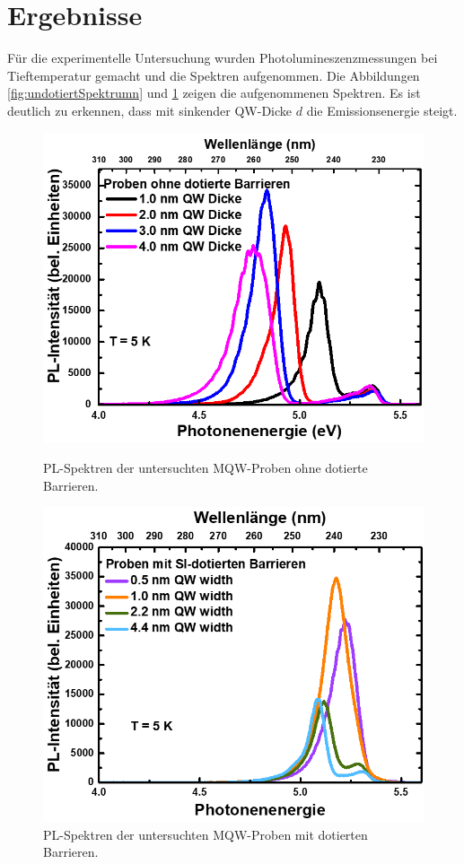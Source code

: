 \section{Ergebnisse}
Für die experimentelle Untersuchung wurden Photolumineszenzmessungen bei Tieftemperatur gemacht und die Spektren aufgenommen.
Die Abbildungen \ref{fig:undotiertSpektrumn} und \ref{fig:dotiertSpektrumn} zeigen die aufgenommenen Spektren.
Es ist deutlich zu erkennen, dass mit sinkender QW-Dicke $d$ die Emissionsenergie steigt.
\begin{figure}[H]
  \centering
  \begin{minipage}[t]{0.45\textwidth}
    \centering
    \includegraphics[width=\textwidth]{Bilder/MQWdickenSerie/spektrumUndotiert}
		\caption{PL-Spektren der untersuchten MQW-Proben ohne dotierte Barrieren.}
    \label{fig:undotiertSpektrumn}
  \end{minipage}
	\hfill
  \begin{minipage}[t]{0.45\textwidth}
    \centering
    \includegraphics[width=\linewidth]{Bilder/MQWdickenSerie/spektrumDotiert}
		\caption{PL-Spektren der untersuchten MQW-Proben mit dotierten Barrieren.}
    \label{fig:dotiertSpektrumn}
  \end{minipage}
\end{figure}
